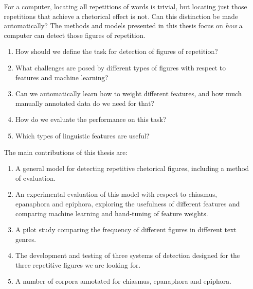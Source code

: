 For a computer, locating all repetitions of words is trivial, but locating just those repetitions that achieve a rhetorical effect is not. Can this distinction be made automatically? The methods and models presented in this thesis focus on \textit{how} a computer can detect those figures of repetition. 
\begin{enumerate}
\item How should we define the task for detection of figures of repetition?
\item  What challenges are posed by different types of figures with respect to features and machine learning?

\item Can we automatically learn how to weight different features, and how much manually annotated data do we need for that?
\item How do we evaluate the performance on this task?
\item Which types of linguistic features are useful?


\end{enumerate}
The main contributions of this thesis are:
\begin{enumerate}
\item A general model for detecting repetitive rhetorical figures, including a method of evaluation.
\item An experimental evaluation of this model with respect to chiasmus, epa\-naphora and epiphora, exploring the usefulness of different features and comparing machine learning and hand-tuning of feature weights.
\item A pilot study comparing the frequency of different figures in different text genres.
\item The development and testing of three systems of detection designed for the three repetitive figures we are looking for.
\item A number of corpora annotated for chiasmus, epanaphora and epiphora.
\end{enumerate}
